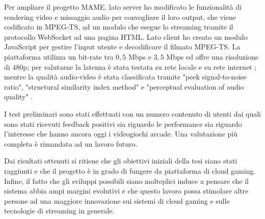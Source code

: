\documentclass{article} %
\begin{document}
Per ampliare il progetto MAME, lato server ho modificato le funzionalità di rendering video e missaggio audio per convogliare il loro output, che viene codificato in MPEG-TS, ad un modulo che esegue lo streaming tramite il protocollo WebSocket ad una pagina HTML. Lato client ho creato un modulo JavaScript per gestire l'input utente e decodificare il filmato MPEG-TS. La piattaforma utilizza un bit-rate tra $0,5$ Mbps e $3,5$ Mbps ed offre una risoluzione di 480p; per valutarne la latenza è stata testata su rete locale e su rete internet \parencite{Latency_analysis_for_M2M}; mentre la qualità audio-video è stata classificata tramite "peek signal-to-noise ratio", "structural similarity index method" e "perceptual evaluation of audio quality" \parencite{Cloud_Gaming_Architecture_and_Performance}.

I test preliminari sono stati effettuati con un numero contenuto di utenti dai quali sono stati ricevuti feedback positivi sia riguardo le performance sia riguardo l'interesse che hanno ancora oggi i videogiochi arcade. Una valutazione più completa è rimandata ad un lavoro futuro.

Dai risultati ottenuti si ritiene che gli obiettivi iniziali della tesi siano stati raggiunti e che il progetto è in grado di fungere da piattaforma di cloud gaming. Infine, il fatto che gli sviluppi possibili siano molteplici induce a pensare che il sistema abbia ampi margini evolutivi e che questo lavoro possa stimolare altre persone ad una maggiore innovazione sui sistemi di cloud gaming e sulle tecnologie di streaming in generale.

\nocite{*}

\printbibliography[nottype=misc,title={Bibliografia},heading=bibintoc]
\printbibliography[type=misc,title={Sitografia},heading=bibintoc]
\end{document}
